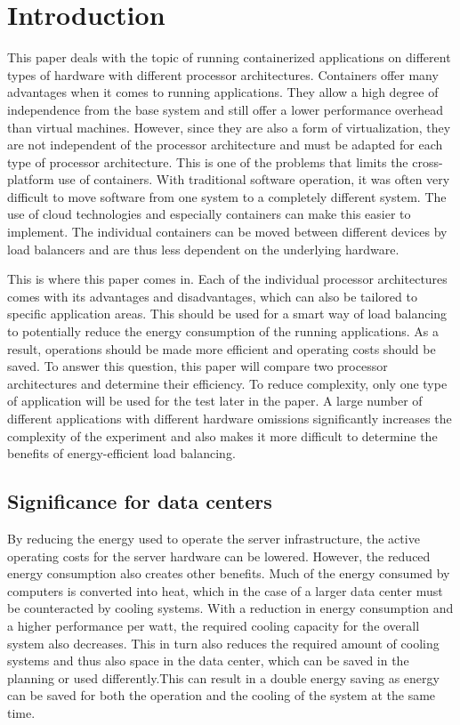 \section{Introduction}
This paper deals with the topic of running containerized applications on
different types of hardware with different processor architectures.  Containers
offer many advantages when it comes to running applications. They allow a high
degree of independence from the base system and still offer a lower performance
overhead than virtual machines. However, since they are also a form of
virtualization, they are not independent of the processor architecture and must
be adapted for each type of processor architecture. This is one of the problems
that limits the cross-platform use of containers.  With traditional software
operation, it was often very difficult to move software from one system to a
completely different system. The use of cloud technologies and especially
containers can make this easier to implement. The individual containers can be
moved between different devices by load balancers and are thus less dependent
on the underlying hardware.

This is where this paper comes in. Each of the individual processor
architectures comes with its advantages and disadvantages, which can also be
tailored to specific application areas. This should be used for a smart way of
load balancing to potentially reduce the energy consumption of the running
applications. As a result, operations should be made more efficient and
operating costs should be saved.  To answer this question, this paper will
compare two processor architectures and determine their efficiency. To reduce
complexity, only one type of application will be used for the test later in the
paper. A large number of different applications with different hardware
omissions significantly increases the complexity of the experiment and also
makes it more difficult to determine the benefits of energy-efficient load
balancing.

\subsection{Significance for data centers}
By reducing the energy used to operate the server infrastructure, the active
operating costs for the server hardware can be lowered. However, the reduced
energy consumption also creates other benefits. Much of the energy consumed by
computers is converted into heat, which in the case of a larger data center
must be counteracted by cooling systems. With a reduction in energy consumption
and a higher performance per watt, the required cooling capacity for the
overall system also decreases. This in turn also reduces the required amount of
cooling systems and thus also space in the data center, which can be saved in
the planning or used differently.This can result in a double energy saving as
energy can be saved for both the operation and the cooling of the system at the
same time.

